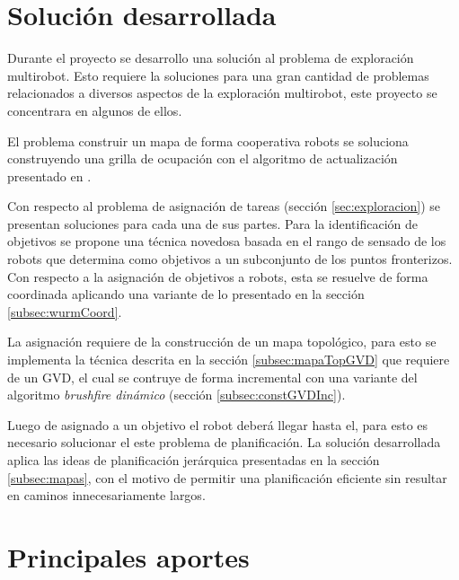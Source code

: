 \section{Solución desarrollada}
Durante el proyecto se desarrollo una solución al problema de exploración
multirobot. Esto requiere la soluciones para una gran cantidad de problemas
relacionados a diversos aspectos de la exploración multirobot, este proyecto se
concentrara en algunos de ellos.

El problema construir un mapa de forma cooperativa robots se soluciona construyendo una grilla de ocupación con
el algoritmo de actualización presentado en \cite{stachniss2009robotic}.


Con respecto al problema de asignación de tareas (sección
\ref{sec:exploracion}) se presentan soluciones para cada una de sus partes.
Para la identificación de objetivos se propone una técnica novedosa basada en
el rango de sensado de los robots que determina 
  como objetivos a un
  subconjunto de los puntos fronterizos. Con respecto a la asignación de
  objetivos a robots, esta se resuelve de forma coordinada aplicando una
  variante de lo presentado en la sección \ref{subsec:wurmCoord}.

La asignación requiere de la construcción de
un mapa topológico, para esto se implementa
la técnica descrita en la sección
\ref{subsec:mapaTopGVD} que requiere de un
GVD, el cual se contruye de forma
incremental con una variante del algoritmo
\emph{brushfire dinámico} (sección
\ref{subsec:constGVDInc}).

Luego de asignado a un objetivo el robot deberá llegar hasta el, para esto es
necesario solucionar el este problema de planificación. La solución desarrollada 
aplica las ideas de planificación jerárquica presentadas en la sección
\ref{subsec:mapas}, con el motivo de permitir una planificación eficiente sin
resultar en caminos innecesariamente largos.


\section{Principales aportes}

